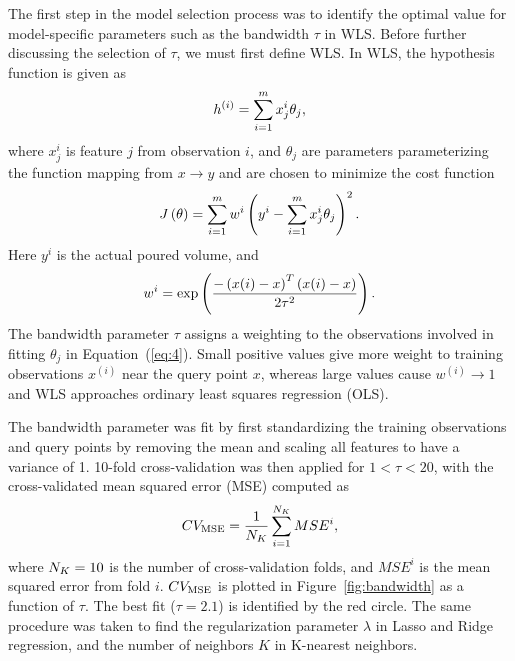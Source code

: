 \documentclass[twocolumn,10pt]{article}
\begin{document}
The first step in the model selection process was to identify the optimal value for model-specific parameters such as the bandwidth $\tau$ in WLS. Before further discussing the selection of $\tau$, we must first define WLS. In WLS, the hypothesis function is given as 
\begin{equation} \label{eq:3}
h^{(i)} = \sum_{i = 1}^{m} x^{i}_{j} \theta_{j}\\,
\end{equation}
where $x^{i}_{j}$ is feature $j$ from observation $i$, and $\theta_{j}$ are parameters parameterizing the function mapping from $x \rightarrow y$ and are chosen to minimize the cost function 
\begin{equation} \label{eq:4}
J\left(\theta \right) = \sum_{i=1}^{m} w^{i} \left( y^{i} - \sum_{i = 1}^{m} x^{i}_{j} \theta_{j} \right)^{2}\\.
\end{equation}
Here $y^{i}$ is the actual poured volume, and  
\begin{equation} \label{eq:5}
w^{i} = \exp \left( \frac{- \left( x(i)-x \right)^{T} \left( x(i)-x \right)}{2 \tau^{2}} \right)\\.
\end{equation}
The bandwidth parameter $\tau$ assigns a weighting to the observations involved in fitting $\theta_{j}$ in Equation~(\ref{eq:4}). Small positive values give more weight to training observations $x^{(i)}$ near the query point $x$, whereas large values cause $w^{(i)} \rightarrow 1$ and WLS approaches ordinary least squares regression (OLS). 

The bandwidth parameter was fit by first standardizing the training observations and query points by removing the mean and scaling all features to have a variance of 1. 10-fold cross-validation was then applied for $1<\tau<20$, with the cross-validated mean squared error (MSE) computed as 
\begin{equation} \label{eq:6}
CV_{\hbox{\scriptsize MSE}} = \frac{1}{N_{\scriptsize K}} \sum^{N_{\scriptsize K}}_{i=1} MSE^{i} \\,
\end{equation}
where $N_{\scriptsize K}=10$ is the number of cross-validation folds, and $MSE^{i}$ is the mean squared error from fold $i$. $CV_{\hbox{\scriptsize MSE}}$ is plotted in Figure~\ref{fig:bandwidth} as a function of $\tau$. The best fit ($\tau=2.1$) is identified by the red circle. The same procedure was taken to find the regularization parameter $\lambda$ in Lasso and Ridge regression, and the number of neighbors $K$ in K-nearest neighbors.       
\end{document}
